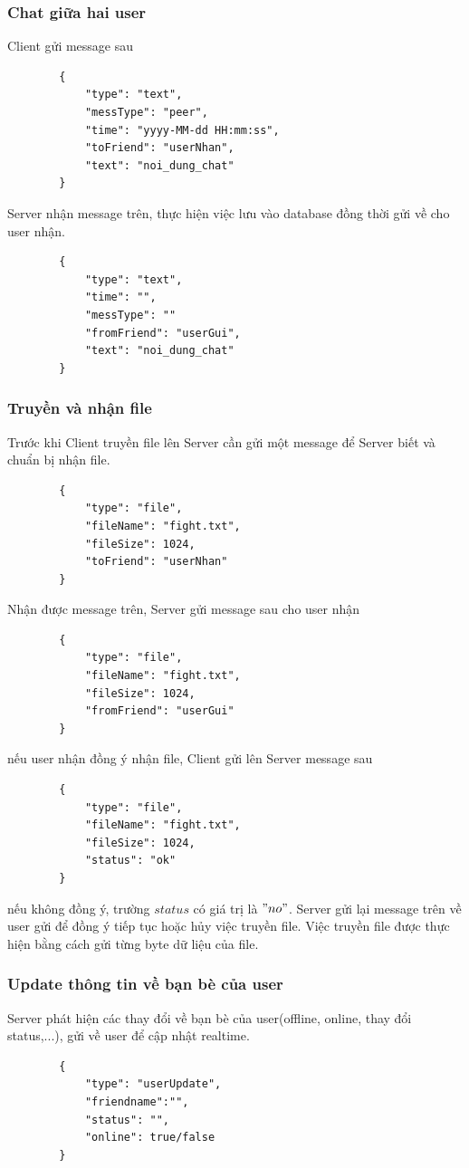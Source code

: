 \documentclass[10pt]{article}
\begin{document}
			\subsubsection{Chat giữa hai user}
				Client gửi message sau
				\begin{lstlisting}
        {
	        "type": "text",
	        "messType": "peer",
	        "time": "yyyy-MM-dd HH:mm:ss",
	        "toFriend": "userNhan",
	        "text": "noi_dung_chat"
        }
        			\end{lstlisting} 
				Server nhận message trên, thực hiện việc lưu vào database đồng thời gửi về cho user nhận.
				\begin{lstlisting}
        {
	        "type": "text",
	        "time": "",
	        "messType": ""
	        "fromFriend": "userGui",
	        "text": "noi_dung_chat"
        }
                	\end{lstlisting}
    			\subsubsection{Truyền và nhận file}
    				Trước khi Client truyền file lên Server cần gửi một message để Server biết và chuẩn bị nhận file.
				\begin{lstlisting}
	    {
		    "type": "file",
		    "fileName": "fight.txt",
		    "fileSize": 1024,
		    "toFriend": "userNhan"
	    }
				\end{lstlisting}
				Nhận được message trên, Server gửi message sau cho user nhận
				\begin{lstlisting}
	    {
		    "type": "file",
		    "fileName": "fight.txt",
		    "fileSize": 1024,
		    "fromFriend": "userGui"
	    }
				\end{lstlisting}
				nếu user nhận đồng ý nhận file, Client gửi lên Server message sau
				\begin{lstlisting}
	    {
		    "type": "file",
		    "fileName": "fight.txt",
		    "fileSize": 1024,
		    "status": "ok"
	    }
				\end{lstlisting}
				nếu không đồng ý, trường $status$ có giá trị là $"no"$.
				Server gửi lại message trên về user gửi để đồng ý tiếp tục hoặc hủy việc truyền file. Việc truyền file được thực hiện bằng cách gửi từng byte dữ liệu của file.
    			\subsubsection{Update thông tin về bạn bè của user}
    				Server phát hiện các thay đổi về bạn bè của user(offline, online, thay đổi status,...), gửi về user để cập nhật realtime.
				\begin{lstlisting}
	    {
		    "type": "userUpdate",
		    "friendname":"",
		    "status": "",
		    "online": true/false
	    }
    				\end{lstlisting}
\end{document}

